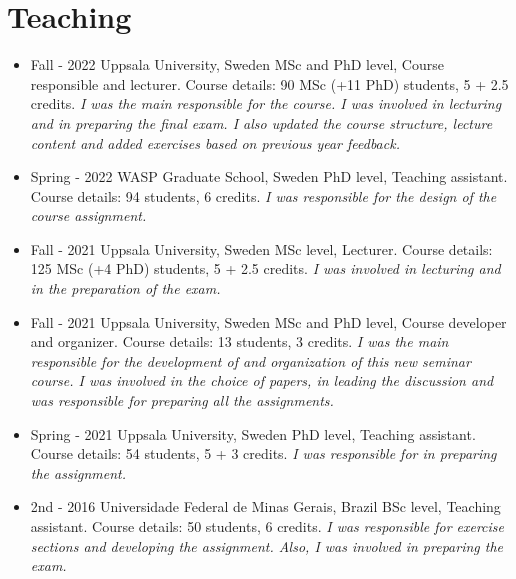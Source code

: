 \documentclass[10pt,A4]{article} %
\begin{document}
\section{Teaching}

 \begin{itemize}

    \item {}
    {   Fall - 2022  }
    { Uppsala University, Sweden }
    {  MSc and PhD level, Course responsible and lecturer. Course details: 90 MSc (+11 PhD) students, 5 + 2.5 credits.  \emph{ I was the main responsible for the course. I was involved in lecturing and in preparing the final exam. I also updated the course structure, lecture content and added exercises based on previous year feedback. } }
    
    \item {}
    {   Spring - 2022  }
    { WASP Graduate School, Sweden }
    {  PhD level, Teaching assistant. Course details: 94 students, 6 credits.  \emph{ I was responsible for the design of the course assignment. } }
    
    \item {}
    {   Fall - 2021  }
    { Uppsala University, Sweden }
    {  MSc level, Lecturer. Course details: 125 MSc (+4 PhD) students, 5 + 2.5 credits.  \emph{ I was involved in lecturing and in the preparation of the exam. } }
    
    \item {}
    {   Fall - 2021  }
    { Uppsala University, Sweden }
    {  MSc and PhD level, Course developer and organizer. Course details: 13 students, 3 credits.  \emph{ I was the main responsible for the development of and organization of this new seminar course. I was involved in the choice of papers, in leading the discussion and was responsible for preparing all the assignments. } }
    
    \item {}
    {   Spring - 2021  }
    { Uppsala University, Sweden }
    {  PhD level, Teaching assistant. Course details: 54 students, 5 + 3 credits.  \emph{ I was responsible for in preparing the assignment. } }
    
    \item {}
    {   2nd - 2016  }
    { Universidade Federal de Minas Gerais, Brazil }
    {  BSc level, Teaching assistant. Course details: 50 students, 6 credits.  \emph{ I was responsible for exercise sections and developing the assignment. Also, I was involved in preparing the exam. } }
    

\end{itemize}
\end{document}
